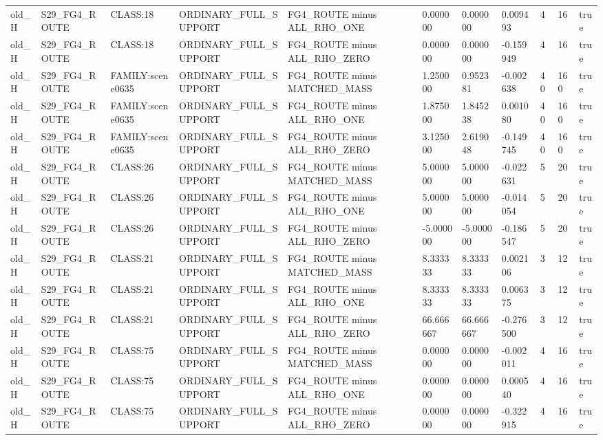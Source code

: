 \begin{tabular}{lllllllllll}
old\_H & S29\_FG4\_ROUTE & CLASS:18 & ORDINARY\_FULL\_SUPPORT & FG4\_ROUTE minus ALL\_RHO\_ONE & 0.000000 & 0.000000 & 0.009493 & 4 & 16 & true \\
old\_H & S29\_FG4\_ROUTE & CLASS:18 & ORDINARY\_FULL\_SUPPORT & FG4\_ROUTE minus ALL\_RHO\_ZERO & 0.000000 & 0.000000 & -0.159949 & 4 & 16 & true \\
old\_H & S29\_FG4\_ROUTE & FAMILY:scene0635 & ORDINARY\_FULL\_SUPPORT & FG4\_ROUTE minus MATCHED\_MASS & 1.250000 & 0.952381 & -0.002638 & 40 & 160 & true \\
old\_H & S29\_FG4\_ROUTE & FAMILY:scene0635 & ORDINARY\_FULL\_SUPPORT & FG4\_ROUTE minus ALL\_RHO\_ONE & 1.875000 & 1.845238 & 0.001080 & 40 & 160 & true \\
old\_H & S29\_FG4\_ROUTE & FAMILY:scene0635 & ORDINARY\_FULL\_SUPPORT & FG4\_ROUTE minus ALL\_RHO\_ZERO & 3.125000 & 2.619048 & -0.149745 & 40 & 160 & true \\
old\_H & S29\_FG4\_ROUTE & CLASS:26 & ORDINARY\_FULL\_SUPPORT & FG4\_ROUTE minus MATCHED\_MASS & 5.000000 & 5.000000 & -0.022631 & 5 & 20 & true \\
old\_H & S29\_FG4\_ROUTE & CLASS:26 & ORDINARY\_FULL\_SUPPORT & FG4\_ROUTE minus ALL\_RHO\_ONE & 5.000000 & 5.000000 & -0.014054 & 5 & 20 & true \\
old\_H & S29\_FG4\_ROUTE & CLASS:26 & ORDINARY\_FULL\_SUPPORT & FG4\_ROUTE minus ALL\_RHO\_ZERO & -5.000000 & -5.000000 & -0.186547 & 5 & 20 & true \\
old\_H & S29\_FG4\_ROUTE & CLASS:21 & ORDINARY\_FULL\_SUPPORT & FG4\_ROUTE minus MATCHED\_MASS & 8.333333 & 8.333333 & 0.002106 & 3 & 12 & true \\
old\_H & S29\_FG4\_ROUTE & CLASS:21 & ORDINARY\_FULL\_SUPPORT & FG4\_ROUTE minus ALL\_RHO\_ONE & 8.333333 & 8.333333 & 0.006375 & 3 & 12 & true \\
old\_H & S29\_FG4\_ROUTE & CLASS:21 & ORDINARY\_FULL\_SUPPORT & FG4\_ROUTE minus ALL\_RHO\_ZERO & 66.666667 & 66.666667 & -0.276500 & 3 & 12 & true \\
old\_H & S29\_FG4\_ROUTE & CLASS:75 & ORDINARY\_FULL\_SUPPORT & FG4\_ROUTE minus MATCHED\_MASS & 0.000000 & 0.000000 & -0.002011 & 4 & 16 & true \\
old\_H & S29\_FG4\_ROUTE & CLASS:75 & ORDINARY\_FULL\_SUPPORT & FG4\_ROUTE minus ALL\_RHO\_ONE & 0.000000 & 0.000000 & 0.000540 & 4 & 16 & true \\
old\_H & S29\_FG4\_ROUTE & CLASS:75 & ORDINARY\_FULL\_SUPPORT & FG4\_ROUTE minus ALL\_RHO\_ZERO & 0.000000 & 0.000000 & -0.322915 & 4 & 16 & true \\

\end{tabular}
